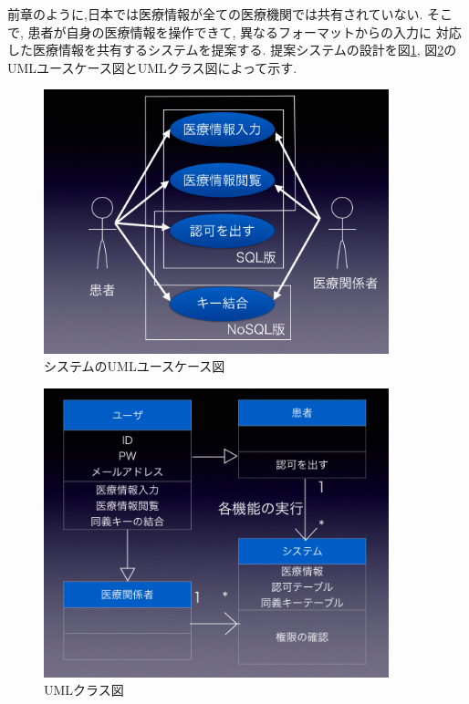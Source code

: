 前章のように,日本では医療情報が全ての医療機関では共有されていない.
そこで,
患者が自身の医療情報を操作できて,
異なるフォーマットからの入力に
対応した医療情報を共有するシステムを提案する.
提案システムの設計を図\ref{system_construct},
図\ref{class}の
UMLユースケース図とUMLクラス図によって示す.

\begin{figure}[htbp]
  \begin{center}
    \includegraphics[width=10cm, bb=0 0 1003 768]{./gazou/system_construct2.png}
  \end{center}
  \caption{システムのUMLユースケース図}
  \label{system_construct}
\end{figure}

\begin{figure}[htbp]
  \begin{center}
    \includegraphics[width=10cm, bb=0 0 916 760]{./gazou/class.png}
  \end{center}
  \caption{UMLクラス図}
  \label{class}
\end{figure}

